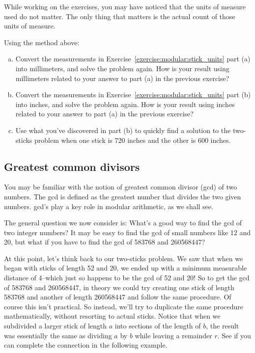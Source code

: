 While working on the exercises, you may have noticed that the units of measure used do not matter.  The only thing that matters is the actual count of those units of measure.  

\begin{exercise}{}
Using the method above:
\begin{enumerate}[(a)]
\item
Convert the measurements in Exercise~\ref{exercise:modular:stick_units} part (a) into millimeters, and solve the problem again. How is your result using millimeters related to your answer to part (a) in the previous exercise?
\item
Convert the measurements in Exercise~\ref{exercise:modular:stick_units} part (b) into inches, and solve the problem again. How is your result using inches related to your answer to part (a) in the previous exercise?
\item
Use what you've discovered in part (b) to quickly find a solution to the two-sticks problem when one stick is 720 inches and the other is 600 inches.
\end{enumerate}
\end{exercise}

\subsection{Greatest common divisors}
You may be  familiar with the notion of greatest common divisor (gcd) of two numbers.  The gcd is defined as the greatest number that divides the two given numbers. gcd's play a key role in modular arithmetic, as we shall see. 

The general question we now consider is: What's a good way to find the gcd of two integer numbers? It may be easy to find the gcd of small numbers like 12 and 20, but what if you have to find the gcd of 583768 and 260568447? 

At this point, let's think back to our two-sticks problem. We saw that when we began with sticks of length 52 and 20, we ended up with a minimum measurable distance of 4--which just so happens to be the gcd of 52 and 20! So to get the gcd of 583768 and 260568447, in theory we could try creating one stick of length 583768 and another of length 260568447 and follow the same procedure. Of course this isn't practical. So instead, we'll try to duplicate the same procedure mathematically, without resorting to actual sticks.  Notice that when we subdivided a larger stick of length $a$ into sections of the length of $b$, the result was essentially the same as dividing $a$ by $b$ while leaving a remainder $r$.  See if you can complete the connection in the following example.

